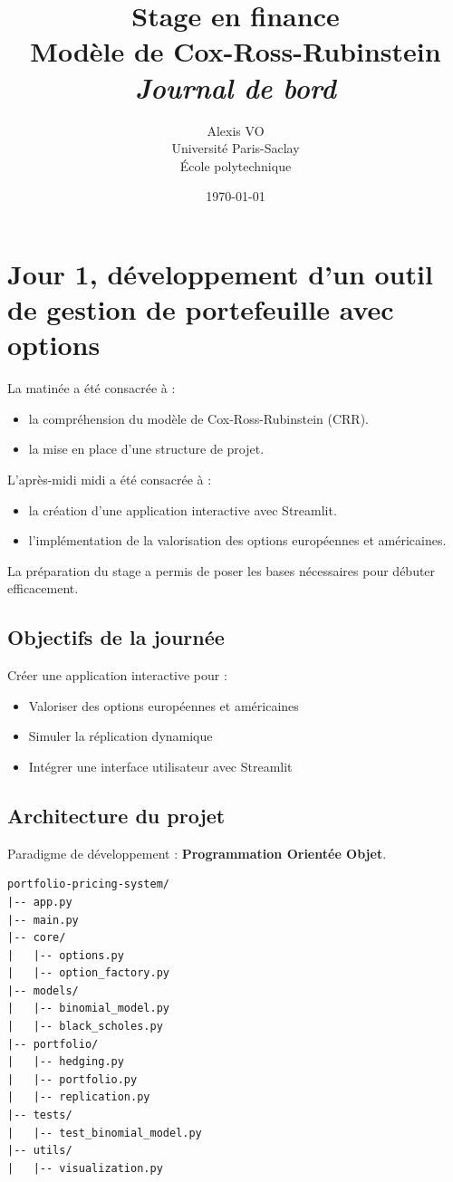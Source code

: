 \documentclass[a4paper,11pt]{article}
\title{\Huge{\textbf{Stage en finance\\ Modèle de Cox-Ross-Rubinstein}}\\ \medskip
      \Huge{\textit{Journal de bord}}\vspace*{0.7cm}}
\author{\LARGE{Alexis VO}\vspace{1cm}\\ \medskip
      Université Paris-Saclay\\École polytechnique}
\date{\vspace{0.2cm}\today}
\begin{document}
\maketitle
\newpage
\tableofcontents
\newpage


\section{Jour 1, développement d’un outil de gestion de portefeuille avec options}
\noindent La matinée a été consacrée à :
\begin{itemize}
    \item la compréhension du modèle de Cox-Ross-Rubinstein (CRR).
    \item la mise en place d'une structure de projet.
\end{itemize}
L'après-midi midi a été consacrée à :
\begin{itemize}
    \item la création d'une application interactive avec Streamlit.
    \item l'implémentation de la valorisation des options européennes et américaines.
\end{itemize}
La préparation du stage a permis de poser les bases nécessaires pour débuter efficacement.

\subsection{Objectifs de la journée}
Créer une application interactive pour :
\begin{itemize}
    \item Valoriser des options européennes et américaines
    \item Simuler la réplication dynamique
    \item Intégrer une interface utilisateur avec Streamlit
\end{itemize}

\subsection{Architecture du projet}
Paradigme de développement : \textbf{Programmation Orientée Objet}.
\begin{verbatim}
portfolio-pricing-system/
|-- app.py
|-- main.py
|-- core/
|   |-- options.py
|   |-- option_factory.py
|-- models/
|   |-- binomial_model.py
|   |-- black_scholes.py
|-- portfolio/
|   |-- hedging.py
|   |-- portfolio.py
|   |-- replication.py
|-- tests/
|   |-- test_binomial_model.py
|-- utils/
|   |-- visualization.py
\end{verbatim}
\end{document}
